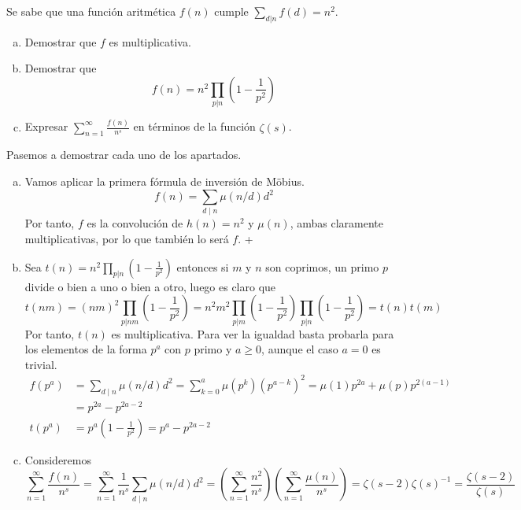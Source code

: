 \documentclass[twoside]{article}
\begin{document}
\newpage

\begin{ejercicio}{7}
Se sabe que una función aritmética $f(n)$ cumple $\sum_{d|n} f(d) = n^2$.
\begin{enumerate}[(a)]
\item Demostrar que $f$ es multiplicativa.
\item Demostrar que
\[ f(n) = n^2 \prod_{p|n} \left(1-\frac{1}{p^2}\right)\]
\item Expresar $\sum_{n=1}^{∞} \frac{f(n)}{n^s}$ en términos de la función $ζ(s)$.
\end{enumerate}
\end{ejercicio}
\begin{solucion} Pasemos a demostrar cada uno de los apartados.
 \begin{enumerate}[(a)]
 \item Vamos aplicar la primera fórmula de inversión de Möbius.
 $$
 f(n)=\sum_{d\mid n}\mu(n/d)d^2
 $$
 Por tanto, $f$ es la convolución de $h(n)=n^2$ y $\mu(n)$, ambas claramente multiplicativas, por lo que también lo será $f$.
 +\item Sea $t(n) = n^2 \prod_{p|n} \left(1-\frac{1}{p^2}\right)$ entonces si $m$ y $n$ son coprimos, un primo $p$ divide o bien a uno o bien a otro, luego es claro que
 $$
 t(nm) = (nm)^2\prod_{p|nm} \left(1-\frac{1}{p^2}\right) = n^2m^2\prod_{p|m} \left(1-\frac{1}{p^2}\right)\prod_{p|n} \left(1-\frac{1}{p^2}\right)=t(n)t(m)
 $$
 Por tanto, $t(n)$ es multiplicativa. Para ver la igualdad basta probarla para los elementos de la forma $p^a$ con $p$ primo y $a\geq 0$, aunque el caso $a=0$ es trivial.
 \begin{align*}
 f(p^a)&= \sum_{d\mid n}\mu(n/d)d^2 = \sum_{k=0}^a\mu(p^k)(p^{a-k})^2 = \mu(1)p^{2a} + \mu(p)p^{2(a-1)}\\
 &=p^{2a}-p^{2a-2}\\
 t(p^a)&= p^a \left(1-\frac{1}{p^2}\right) = p^a - p^{2a-2}
 \end{align*}
 \item Consideremos
 $$
 \sum_{n=1}^{∞} \frac{f(n)}{n^s} = \sum_{n=1}^{∞} \frac{1}{n^s} \sum_{d\mid n}\mu(n/d)d^2 = \left( \sum_{n=1}^{∞} \frac{n^2}{n^s} \right)\left( \sum_{n=1}^{∞} \frac{\mu(n)}{n^s} \right) = \zeta(s-2)\zeta(s)^{-1} = \frac{\zeta(s-2)}{\zeta(s)}
 $$
 \end{enumerate}
\end{solucion}
\newpage
\end{document}
